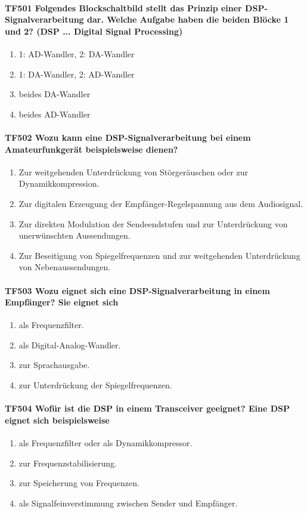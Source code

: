 \documentclass[8pt]{article}
\begin{document}
\paragraph*{TF501 Folgendes Blockschaltbild stellt das Prinzip einer DSP-Signalverarbeitung dar. Welche Aufgabe haben die beiden Blöcke 1 und 2? (DSP ... Digital Signal Processing)}
\begin{enumerate}[nolistsep,label=\Alph*]
\item 1: AD-Wandler, 2: DA-Wandler
\item 1: DA-Wandler, 2: AD-Wandler
\item beides DA-Wandler
\item beides AD-Wandler
\end{enumerate}

\paragraph*{TF502 Wozu kann eine DSP-Signalverarbeitung bei einem Amateurfunkgerät beispielsweise dienen?}
\begin{enumerate}[nolistsep,label=\Alph*]
\item Zur weitgehenden Unterdrückung von Störgeräuschen oder zur Dynamikkompression.
\item Zur digitalen Erzeugung der Empfänger-Regelspannung aus dem Audiosignal.
\item Zur direkten Modulation der Sendeendstufen und zur Unterdrückung von unerwünschten Aussendungen.
\item Zur Beseitigung von Spiegelfrequenzen und zur weitgehenden Unterdrückung von Nebenaussendungen.
\end{enumerate}

\paragraph*{TF503 Wozu eignet sich eine DSP-Signalverarbeitung in einem Empfänger? Sie eignet sich}
\begin{enumerate}[nolistsep,label=\Alph*]
\item als Frequenzfilter.
\item als Digital-Analog-Wandler.
\item zur Sprachausgabe.
\item zur Unterdrückung der Spiegelfrequenzen.
\end{enumerate}

\paragraph*{TF504 Wofür ist die DSP in einem Transceiver geeignet? Eine DSP eignet sich beispielsweise}
\begin{enumerate}[nolistsep,label=\Alph*]
\item als Frequenzfilter oder als Dynamikkompressor.
\item zur Frequenzstabilisierung.
\item zur Speicherung von Frequenzen.
\item als Signalfeinverstimmung zwischen Sender und Empfänger.
\end{enumerate}
\end{document}
